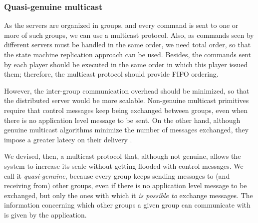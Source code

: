 \documentclass[]{usiinfprospectus}
\begin{document}
%



\subsubsection{Quasi-genuine multicast} \label{sec:optmcast}

As the servers are organized in groups, and every command is sent to one or more of such groups, we can use a multicast protocol. Also, as commands seen by different servers must be handled in the same order, we need total order, so that the state machine replication approach can be used. Besides, the commands sent by each player should be executed in the same order in which this player issued them; therefore, the multicast protocol should provide FIFO ordering.

However, the inter-group communication overhead should be minimized, so that the distributed server would be more scalable. Non-genuine multicast primitives \cite{schiper2009gng} require that control messages keep being exchanged between groups, even when there is no application level message to be sent. On the other hand, although genuine multicast algorithms minimize the number of messages exchanged, they impose a greater latecy on their delivery \cite{schiper2008ica}.

We devised, then, a multicast protocol that, although not genuine, allows the system to increase its scale without getting flooded with control messages. We call it \emph{quasi-genuine}, because every group keeps sending messages to (and receiving from) other groups, even if there is no application level message to be exchanged, but only the ones with which it \emph{is possible to} exchange messages. The information concerning which other groups a given group can communicate with is given by the application.
\end{document}
